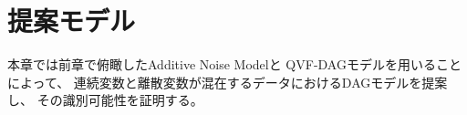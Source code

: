 
\section{提案モデル}
\label{part:proposal}

本章では前章で俯瞰したAdditive Noise Model\cite{Park2020-ey}と
QVF-DAGモデル\cite{Park2017-hw}を用いることによって、
連続変数と離散変数が混在するデータにおけるDAGモデルを提案し、
その識別可能性を証明する。
%

%

